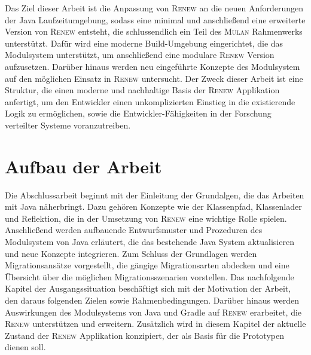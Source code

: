 	Das Ziel dieser Arbeit ist die Anpassung von \textsc{Renew} an die neuen Anforderungen der Java Laufzeitumgebung, sodass eine minimal und anschließend eine erweiterte Version von \textsc{Renew} entsteht, die schlussendlich ein Teil des \textsc{Mulan} Rahmenwerks unterstützt. Dafür wird eine moderne Build-Umgebung eingerichtet, die das Modulsystem unterstützt, um anschließend eine modulare \textsc{Renew} Version aufzusetzen. Darüber hinaus werden neu eingeführte Konzepte des Modulsystem auf den möglichen Einsatz in \textsc{Renew} untersucht. \newline
	Der Zweck dieser Arbeit ist eine Struktur, die einen moderne und nachhaltige Basis der \textsc{Renew} Applikation anfertigt, um den Entwickler einen unkomplizierten Einstieg in die existierende Logik zu ermöglichen, sowie die Entwickler-Fähigkeiten in der Forschung verteilter Systeme voranzutreiben.\bigbreak

\section{Aufbau der Arbeit} \label{sec:AdA}
	Die Abschlussarbeit beginnt mit der Einleitung der Grundalgen, die das Arbeiten mit Java näherbringt. Dazu gehören Konzepte wie der Klassenpfad, Klassenlader und Reflektion, die in der Umsetzung von \textsc{Renew} eine wichtige Rolle spielen. Anschließend werden aufbauende Entwurfsmuster und Prozeduren des Modulsystem von Java erläutert, die das bestehende Java System aktualisieren und neue Konzepte integrieren. Zum Schluss der Grundlagen werden Migrationsansätze vorgestellt, die gängige Migrationsarten abdecken und eine Übersicht über die möglichen Migrationsszenarien vorstellen.\newline 
	Das nachfolgende Kapitel der Ausgangssituation beschäftigt sich mit der Motivation der Arbeit, den daraus folgenden Zielen sowie Rahmenbedingungen. Darüber hinaus werden Auswirkungen des Modulsystems von Java und Gradle auf \textsc{Renew} erarbeitet, die \textsc{Renew} unterstützen und erweitern. Zusätzlich wird in diesem Kapitel der aktuelle Zustand der \textsc{Renew} Applikation konzipiert, der als Basis für die Prototypen dienen soll. \bigbreak 

